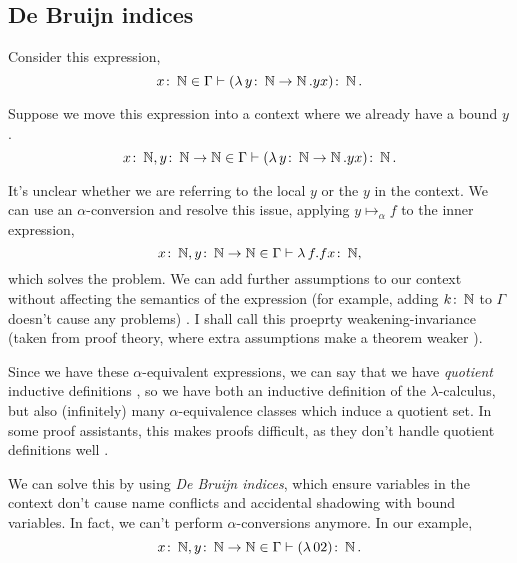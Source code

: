 
\subsection{De Bruijn indices}
\label{section:background_debruijn}
Consider this expression,
\begin{equation*}
  x \colon \operatorname{\mathbb{N}} \in \Gamma \vdash (\lambda \, y \colon \operatorname{\mathbb{N}} \to \operatorname{\mathbb{N}}. y x) \colon \operatorname{\mathbb{N}}.
\end{equation*}

Suppose we move this expression into a context where we already have a bound
$y$.
\begin{equation*}
  x \colon \operatorname{\mathbb{N}}, y \colon \operatorname{\mathbb{N}} \to \operatorname{\mathbb{N}} \in \Gamma \vdash (\lambda \, y \colon \operatorname{\mathbb{N}} \to \operatorname{\mathbb{N}}. y x) \colon \operatorname{\mathbb{N}}.
\end{equation*}

It's unclear whether we are referring to the local $y$ or the $y$ in the context. We can use an
$\alpha$-conversion and resolve this issue, applying $y \mapsto_{\alpha} f$ to the inner expression,
\begin{equation*}
  x \colon \operatorname{\mathbb{N}}, y \colon \operatorname{\mathbb{N}} \to \operatorname{\mathbb{N}} \in \Gamma \vdash \lambda \, f. f x \colon \operatorname{\mathbb{N}},
\end{equation*}
which solves the problem. We can add further assumptions to our context without affecting the
semantics of the expression (for example, adding $k \colon \operatorname{\mathbb{N}}$ to $\Gamma$ doesn't cause any
problems) \cite{pitts_locally_2023}. I shall call this proeprty weakening-invariance (taken from
proof theory, where extra assumptions make a theorem weaker \citep{buss_handbook_1998}).

Since we have these $\alpha$-equivalent expressions, we can say that we have \textit{quotient}
inductive definitions \citep{aydemir_engineering_2008}, so we have both an inductive definition of
the $\lambda$-calculus, but also (infinitely) many $\alpha$-equivalence classes which induce a
quotient set. In some proof assistants, this makes proofs difficult, as they don't handle quotient
definitions well \citep{pitts_locally_2023}.

We can solve this by using \textit{De Bruijn indices}, which ensure variables in the context don't
cause name conflicts and accidental shadowing with bound variables. In fact, we can't perform
$\alpha$-conversions anymore. In our example,
\begin{equation*}
  x \colon \operatorname{\mathbb{N}}, y \colon \operatorname{\mathbb{N}} \to \operatorname{\mathbb{N}} \in \Gamma \vdash (\lambda \, 0 2) \colon \operatorname{\mathbb{N}}.
\end{equation*}

